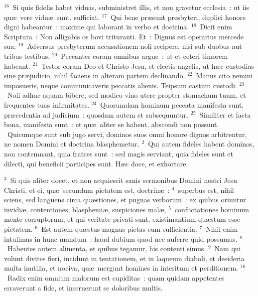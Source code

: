 ${}^{16}$~Si quis fidelis habet viduas, subministret illis, et non gravetur ecclesia~: ut iis qu\ae\ vere vidu\ae\ sunt, sufficiat.
${}^{17}$~Qui bene pr\ae sunt presbyteri, duplici honore digni habeantur~: maxime qui laborant in verbo et doctrina.
${}^{18}$~Dicit enim Scriptura~: Non alligabis os bovi trituranti. Et~: Dignus est operarius mercede sua.
${}^{19}$~Adversus presbyterum accusationem noli recipere, nisi sub duobus aut tribus testibus.
${}^{20}$~Peccantes coram omnibus argue~: ut et ceteri timorem habeant.
${}^{21}$~Testor coram Deo et Christo Jesu, et electis angelis, ut h\ae c custodias sine pr\ae judicio, nihil faciens in alteram partem declinando.
${}^{22}$~Manus cito nemini imposueris, neque communicaveris peccatis alienis. Teipsum castum custodi.
${}^{23}$~Noli adhuc aquam bibere, sed modico vino utere propter stomachum tuum, et frequentes tuas infirmitates.
${}^{24}$~Quorumdam hominum peccata manifesta sunt, pr\ae cedentia ad judicium~: quosdam autem et subsequuntur.
${}^{25}$~Similiter et facta bona, manifesta sunt~: et qu\ae\ aliter se habent, abscondi non possunt.
~Quicumque sunt sub jugo servi, dominos suos omni honore dignos arbitrentur, ne nomen Domini et doctrina blasphemetur.
${}^{2}$~Qui autem fideles habent dominos, non contemnant, quia fratres sunt~: sed magis serviant, quia fideles sunt et dilecti, qui beneficii participes sunt. H\ae c doce, et exhortare.


${}^{3}$~Si quis aliter docet, et non acquiescit sanis sermonibus Domini nostri Jesu Christi, et ei, qu\ae\ secundum pietatem est, doctrin\ae~:
${}^{4}$~superbus est, nihil sciens, sed languens circa qu\ae stiones, et pugnas verborum~: ex quibus oriuntur invidi\ae , contentiones, blasphemi\ae , suspiciones mal\ae ,
${}^{5}$~conflictationes hominum mente corruptorum, et qui veritate privati sunt, existimantium qu\ae stum esse pietatem.
${}^{6}$~Est autem qu\ae stus magnus pietas cum sufficientia.
${}^{7}$~Nihil enim intulimus in hunc mundum~: haud dubium quod nec auferre quid possumus.
${}^{8}$~Habentes autem alimenta, et quibus tegamur, his contenti simus.
${}^{9}$~Nam qui volunt divites fieri, incidunt in tentationem, et in laqueum diaboli, et desideria multa inutilia, et nociva, qu\ae\ mergunt homines in interitum et perditionem.
${}^{10}$~Radix enim omnium malorum est cupiditas~: quam quidam appetentes erraverunt a fide, et inseruerunt se doloribus multis.


